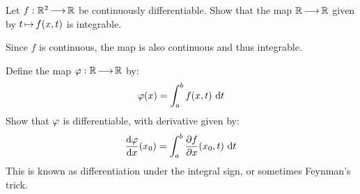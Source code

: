 %
%
%
%


\newpage
\label{q27}
\begin{qu}[num=27.1]
    Let $ f : \mathbb{R}^{2} \operatorname{\longrightarrow} \mathbb{R} $ be continuously differentiable.
    Show that the map $ \mathbb{R} \operatorname{\longrightarrow} \mathbb{R} $ given by $ t \operatorname{\mapsto} f(x, t) $ is
    integrable.
\end{qu}

\begin{soln}
    Since $ f $ is continuous, the map is also continuous and thus integrable.
\end{soln}

\begin{qu}[title=Feynman's Trick,num=27.2]
    Define the map $ \operatorname{\varphi}: \mathbb{R}\operatorname{\longrightarrow} \mathbb{R} $ by:
    \begin{equation*}
        \operatorname{\varphi}(x) = \int_{a}^{b} f(x,t) \textrm{ d} t
    \end{equation*}
    Show that $ \operatorname{\varphi} $ is differentiable, with derivative given by:
    \begin{equation*}
        \frac{\textrm{d}\!\operatorname{\varphi}}{\textrm{d} x}(x_{0}) = \int_{a}^{b}\frac{\partial f}{\partial x} (x_{0}, t)
        \textrm{ d} t
    \end{equation*}
    This is known as differentiation under the integral sign, or sometimes
    Feynman's trick.
\end{qu}

